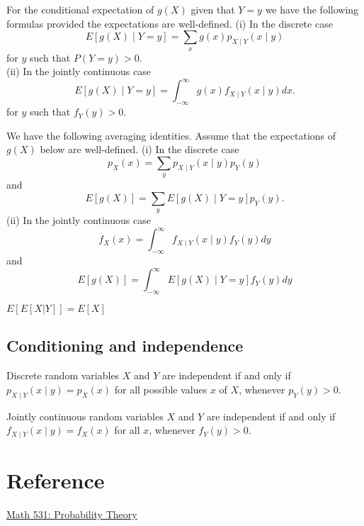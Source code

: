 \documentclass[11pt]{elegantbook}
\begin{document}
\begin{theorem}
For the conditional expectation of $g(X)$ given that $Y=y$ we have the following formulas provided the expectations are well-defined.
(i) In the discrete case
$$
E[g(X) \mid Y=y]=\sum_x g(x) p_{X \mid Y}(x \mid y)
$$
for $y$ such that $P(Y=y)>0$.\\
(ii) In the jointly continuous case
$$
E[g(X) \mid Y=y]=\int_{-\infty}^{\infty} g(x) f_{X \mid Y}(x \mid y) d x .
$$
for $y$ such that $f_Y(y)>0$.
\end{theorem}

\begin{proposition}
 We have the following averaging identities. Assume that the expectations of $g(X)$ below are well-defined.
(i) In the discrete case
$$
p_X(x)=\sum_y p_{X \mid Y}(x \mid y) p_Y(y)
$$
and
$$
E[g(X)]=\sum_y E[g(X) \mid Y=y] p_Y(y) .
$$
(ii) In the jointly continuous case
$$
f_X(x)=\int_{-\infty}^{\infty} f_{X \mid Y}(x \mid y) f_Y(y) d y
$$
and
$$
E[g(X)]=\int_{-\infty}^{\infty} E[g(X) \mid Y=y] f_Y(y) d y
$$
\end{proposition}
\begin{note}
    $E[E[X|Y]] = E[X]$
\end{note}
\section{Conditioning and independence}
\begin{theorem}
Discrete random variables $X$ and $Y$ are independent if and only if $p_{X \mid Y}(x \mid y)=p_X(x)$ for all possible values $x$ of $X$, whenever $p_Y(y)>0$.

Jointly continuous random variables $X$ and $Y$ are independent if and only if $f_{X \mid Y}(x \mid y)=f_X(x)$ for all $x$, whenever $f_Y(y)>0$.
\end{theorem}

\chapter{Reference}

\href{https://people.math.wisc.edu/~valko/courses/531/531.html}{Math 531: Probability Theory} 
\end{document}
